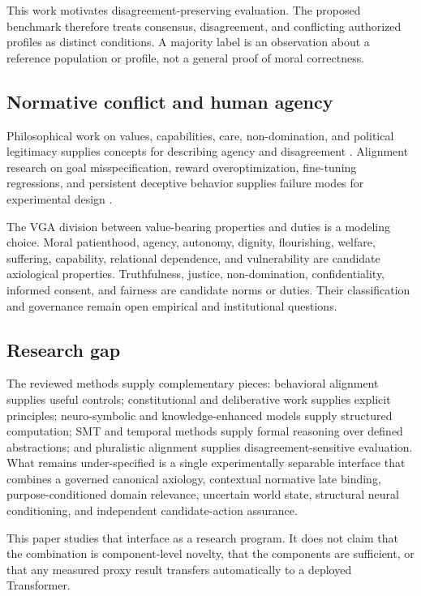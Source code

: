 This work motivates disagreement-preserving evaluation. The proposed benchmark therefore treats consensus, disagreement, and conflicting authorized profiles as distinct conditions. A majority label is an observation about a reference population or profile, not a general proof of moral correctness.

\subsection{Normative conflict and human agency}

Philosophical work on values, capabilities, care, non-domination, and political legitimacy supplies concepts for describing agency and disagreement \citep{gabriel2020values,nussbaum2011capabilities,pettit1997republicanism,gilligan1982different,rawls1993political}. Alignment research on goal misspecification, reward overoptimization, fine-tuning regressions, and persistent deceptive behavior supplies failure modes for experimental design \citep{langosco2022goalmisgeneralization,shah2022goalmisgeneralization,gao2023overoptimization,qi2023finetuning,hubinger2024sleeper}.

The VGA division between value-bearing properties and duties is a modeling choice. Moral patienthood, agency, autonomy, dignity, flourishing, welfare, suffering, capability, relational dependence, and vulnerability are candidate axiological properties. Truthfulness, justice, non-domination, confidentiality, informed consent, and fairness are candidate norms or duties. Their classification and governance remain open empirical and institutional questions.

\subsection{Research gap}

The reviewed methods supply complementary pieces: behavioral alignment supplies useful controls; constitutional and deliberative work supplies explicit principles; neuro-symbolic and knowledge-enhanced models supply structured computation; SMT and temporal methods supply formal reasoning over defined abstractions; and pluralistic alignment supplies disagreement-sensitive evaluation. What remains under-specified is a single experimentally separable interface that combines a governed canonical axiology, contextual normative late binding, purpose-conditioned domain relevance, uncertain world state, structural neural conditioning, and independent candidate-action assurance.

This paper studies that interface as a research program. It does not claim that the combination is component-level novelty, that the components are sufficient, or that any measured proxy result transfers automatically to a deployed Transformer.
